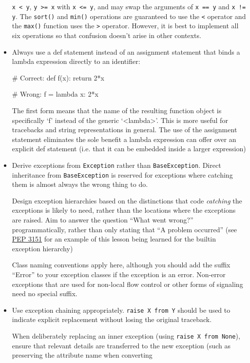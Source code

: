 \documentclass[a4paper,11pt]{article}
\begin{document}
\begin{itemize}
\verb"x < y", \verb"y >= x" with \verb"x <= y", and may swap the arguments of 
\verb"x == y" and \verb"x != y". The \verb"sort()" and \verb"min()" 
operations are guaranteed to use the \verb"<" operator and the \verb"max()" 
function uses the \verb">" operator. However, it is best to implement all six 
operations so that confusion doesn’t arise in other contexts.
\item Always use a def statement instead of an assignment statement that 
binds a lambda expression directly to an identifier:
\begin{python}
# Correct:
def f(x): return 2*x
\end{python}
\begin{python}
# Wrong:
f = lambda x: 2*x
\end{python}
The first form means that the name of the resulting function object is 
specifically ‘f’ instead of the generic ‘<lambda>’. This is more useful for 
tracebacks and string representations in general. The use of the assignment 
statement eliminates the sole benefit a lambda expression can offer over an 
explicit def statement (i.e. that it can be embedded inside a larger 
expression)
\item Derive exceptions from \verb"Exception" rather than 
\verb"BaseException". Direct inheritance from \verb"BaseException" is 
reserved for exceptions where catching them is almost always the wrong thing 
to do.
\par
Design exception hierarchies based on the distinctions that code 
{\it catching} the exceptions is likely to need, rather than the locations 
where the exceptions are raised. Aim to answer the question “What went 
wrong?” programmatically, rather than only stating that “A problem occurred” 
(see \href{https://peps.python.org/pep-3151/}{PEP 3151} for an example of 
this lesson being learned for the builtin exception hierarchy)
\par
Class naming conventions apply here, although you should add the suffix 
“Error” to your exception classes if the exception is an error. Non-error 
exceptions that are used for non-local flow control or other forms of 
signaling need no special suffix.
\item Use exception chaining appropriately. \verb"raise X from Y" should be 
used to indicate explicit replacement without losing the original traceback.
\par
When deliberately replacing an inner exception (using 
\verb"raise X from None"), ensure that relevant details are transferred to 
the new exception (such as preserving the attribute name when converting 

\end{itemize}
\end{document}
